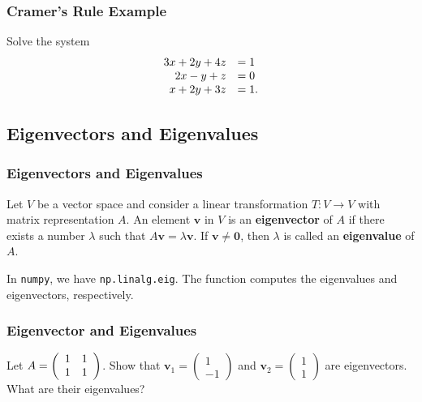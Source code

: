 \documentclass{beamer}
\begin{document}
\begin{frame}[t]
\frametitle{Cramer's Rule Example}
\small
\begin{Example}
Solve the system 
$$
\begin{array}{r l}
3x + 2y + 4z 	&= 1\\
2x - y + z		&= 0\\
x + 2y + 3z	&= 1.
\end{array} 		
$$
\end{Example}


\end{frame}



\subsection{Eigenvectors and Eigenvalues}

\begin{frame}
\frametitle{Eigenvectors and Eigenvalues}
\begin{Definition}
Let $V$ be a vector space and consider a linear transformation $T:V\to V$ with matrix representation $A$. An element ${\boldsymbol v}$ in $V$ is an {\bf eigenvector} of $A$ if there exists a number $\lambda$ such that $A{\boldsymbol v} = \lambda {\boldsymbol v}$. If ${\boldsymbol v}\neq {\boldsymbol 0}$, then $\lambda$ is called an {\bf eigenvalue} of $A$.
\end{Definition}
In \texttt{numpy}, we have \texttt{np.linalg.eig}. The function computes the eigenvalues and eigenvectors, respectively.
\end{frame}

\begin{frame}[t]
\frametitle{Eigenvector and Eigenvalues}
\begin{Example}
{\small
Let $A = \left(\begin{array}{c c} 1	&	1\\	1	&	1\end{array}\right)$. Show that ${\boldsymbol v_1} = \left(\begin{array}{c} 1\\	-1\end{array}\right)$ and ${\boldsymbol v_2} = \left(\begin{array}{c} 1\\ 1\end{array}\right)$ are eigenvectors. What are their eigenvalues?
}
\end{Example}

\end{frame}
\end{document}
